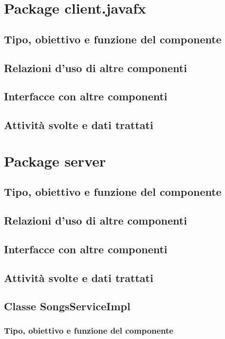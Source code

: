 \section{Package client.javafx} %
\subsection*{Tipo, obiettivo e funzione del componente}
\subsection*{Relazioni d'uso di altre componenti}
\subsection*{Interfacce con altre componenti}
\subsection*{Attivit\`a svolte e dati trattati}
\newpage
\section{Package server} %
\subsection*{Tipo, obiettivo e funzione del componente}
\subsection*{Relazioni d'uso di altre componenti}
\subsection*{Interfacce con altre componenti}
\subsection*{Attivit\`a svolte e dati trattati}

\subsection{Classe SongsServiceImpl}
\subsubsection*{Tipo, obiettivo e funzione del componente}
